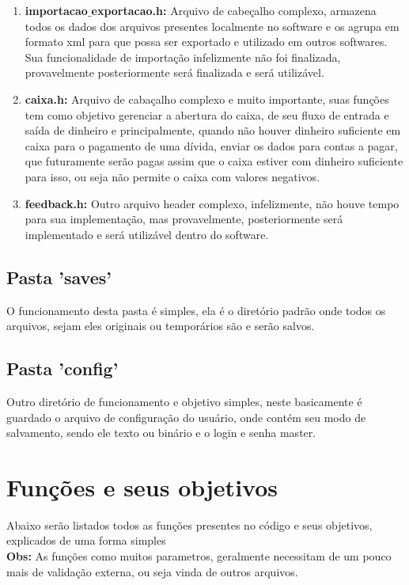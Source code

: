 \documentclass{article}
\begin{document}
\begin{enumerate}
  		\item \textbf{importacao$\_$exportacao.h:} Arquivo de cabeçalho complexo, armazena todos os dados dos arquivos presentes localmente no software e os agrupa em formato xml para que possa ser exportado e utilizado em outros softwares. Sua funcionalidade de importação infelizmente não foi finalizada, provavelmente posteriormente será finalizada e será utilizável.\\
  		\item \textbf{caixa.h:} Arquivo de cabaçalho complexo e muito importante, suas funções tem como objetivo gerenciar a abertura do caixa, de seu fluxo de entrada e saída de dinheiro e principalmente, quando não houver dinheiro suficiente em caixa para o pagamento de uma dívida, enviar os dados para contas a pagar, que futuramente serão pagas assim que o caixa estiver com dinheiro suficiente para isso, ou seja não permite o caixa com valores negativos.\\
  		\item \textbf{feedback.h:} Outro arquivo header complexo, infelizmente, não houve tempo para sua implementação, mas provavelmente, posteriormente será implementado e será utilizável dentro do software.\\		
  	\end{enumerate}
  	\subsection{Pasta 'saves'} O funcionamento desta pasta é simples, ela é o diretório padrão onde todos os arquivos, sejam eles originais ou temporários são e serão salvos.\\
  	\subsection{Pasta 'config'} Outro diretório de funcionamento e objetivo simples, neste basicamente é guardado o arquivo de configuração do usuário, onde contém seu modo de salvamento, sendo ele texto ou binário e o login e senha master.\\
  \newpage
  \section{Funções e seus objetivos}
  Abaixo serão listados todos as funções presentes no código e seus objetivos, explicados de uma forma simples
  \\ \textbf{Obs:} As funções como muitos parametros, geralmente necessitam de um pouco mais de validação externa, ou seja vinda de outros arquivos.\\
\end{document}
